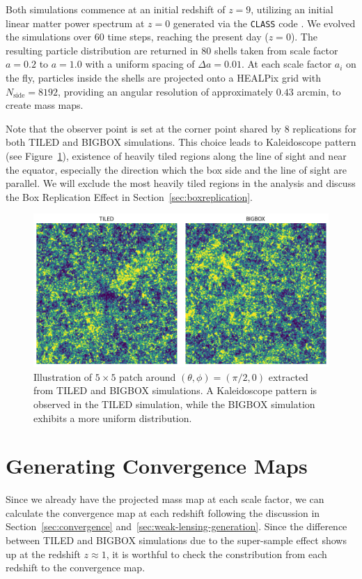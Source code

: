 Both simulations commence at an initial redshift of $z = 9$, utilizing an initial linear matter power spectrum at $z = 0$ generated via the \texttt{CLASS} code \citep{2011JCAP...07..034B}. We evolved the simulations over $60$ time steps, reaching the present day ($z = 0$). The resulting particle distribution are returned in $80$ shells taken from scale factor $a = 0.2$ to $a = 1.0$ with a uniform spacing of $\Delta a = 0.01$. At each scale factor $a_i$ on the fly, particles inside the shells are projected onto a HEALPix grid \citep{Górski_2005} with $N_{\text{side}} = 8192$, providing an angular resolution of approximately $0.43$ arcmin, to create mass maps. 

Note that the observer point is set at the corner point shared by $8$ replications for both TILED and BIGBOX simulations. This choice leads to Kaleidoscope pattern (see Figure~\ref{fig:boxreplication_patch}), existence of heavily tiled regions along the line of sight and near the equator, especially the direction which the box side and the line of sight are parallel. We will exclude the most heavily tiled regions in the analysis and discuss the Box Replication Effect in Section~\ref{sec:boxreplication}. 

\begin{figure}[ht]
    \centering
    \includegraphics[width=\textwidth]{figures/samplepatch.png}
    \caption{Illustration of $5 \times 5$ patch around $(\theta, \phi)= (\pi/2, 0)$ extracted from TILED and BIGBOX simulations. A Kaleidoscope pattern is observed in the TILED simulation, while the BIGBOX simulation exhibits a more uniform distribution.} \label{fig:boxreplication_patch}
\end{figure}

\section{Generating Convergence Maps}
Since we already have the projected mass map at each scale factor, we can calculate the convergence map at each redshift following the discussion in Section~\ref{sec:convergence} and~\ref{sec:weak-lensing-generation}. Since the difference between TILED and BIGBOX simulations due to the super-sample effect shows up at the redshift $z \approx 1$, it is worthful to check the constribution from each redshift to the convergence map.

